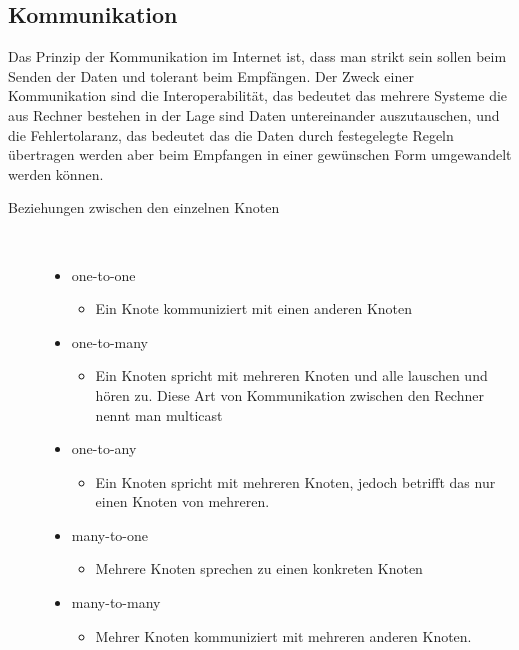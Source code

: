 \documentclass[a4paper,12pt]{article}
\begin{document}
\subsection{Kommunikation}
Das Prinzip der Kommunikation im Internet ist, dass man strikt sein sollen beim Senden der Daten und tolerant beim Empfängen. Der Zweck einer Kommunikation sind die Interoperabilität, das bedeutet
das mehrere Systeme die aus Rechner bestehen in der Lage sind Daten untereinander auszutauschen, und die Fehlertolaranz, das bedeutet das die Daten durch festegelegte Regeln übertragen werden aber beim Empfangen in einer
gewünschen Form umgewandelt werden können.

\begin{description}
    \item[Beziehungen zwischen den einzelnen Knoten] ~\par
    \begin{itemize}
        \item one-to-one
        \begin{itemize}
            \item{Ein Knote kommuniziert mit einen anderen Knoten}
        \end{itemize}
        \item one-to-many
        \begin{itemize}
            \item{Ein Knoten spricht mit mehreren Knoten und alle lauschen und hören zu. Diese Art von Kommunikation zwischen den Rechner nennt man multicast}
        \end{itemize}
        \item one-to-any
        \begin{itemize}
            \item{Ein Knoten spricht mit mehreren Knoten, jedoch betrifft das nur einen Knoten von mehreren.}
        \end{itemize}
        \item many-to-one
        \begin{itemize}
            \item{Mehrere Knoten sprechen zu einen konkreten Knoten}
        \end{itemize}
        \item many-to-many
        \begin{itemize}
            \item{Mehrer Knoten kommuniziert mit mehreren anderen Knoten.\\}
        \end{itemize}
    \end{itemize} 
\end{description}
\end{document}
